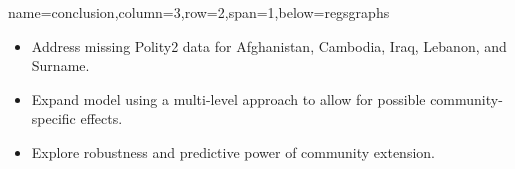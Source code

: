 \documentclass[landscape,paperheight=24in,fontscale=.45,paperwidth=36in,landscape,final]{baposter}
\begin{document}
\begin{poster}
{name=conclusion,column=3,row=2,span=1,below=regsgraphs}
{

\begin{itemize}
\item Address missing Polity2 data for Afghanistan, Cambodia, Iraq,
  Lebanon, and Surname. 
\item Expand model using a multi-level approach to allow for possible
  community-specific effects.
\item Explore robustness and predictive power of community extension.
\end{itemize}
}




\end{poster}
\end{document}
